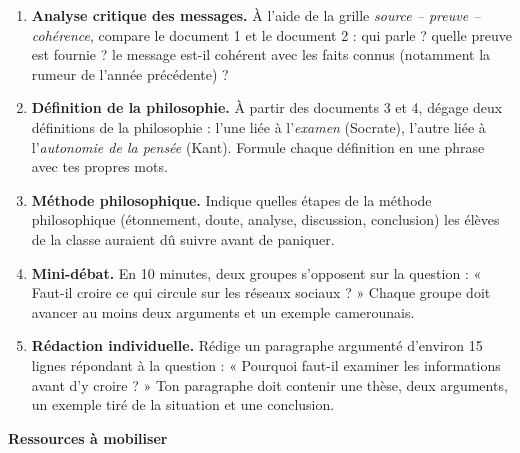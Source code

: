 \documentclass[11pt]{article}
\begin{document}
\begin{enumerate}
\item \textbf{Analyse critique des messages.} À l'aide de la grille \emph{source -- preuve -- cohérence}, compare le document 1 et le document 2 : qui parle ? quelle preuve est fournie ? le message est-il cohérent avec les faits connus (notamment la rumeur de l'année précédente) ?
\item \textbf{Définition de la philosophie.} À partir des documents 3 et 4, dégage deux définitions de la philosophie : l'une liée à l'\emph{examen} (Socrate), l'autre liée à l'\emph{autonomie de la pensée} (Kant). Formule chaque définition en une phrase avec tes propres mots.
\item \textbf{Méthode philosophique.} Indique quelles étapes de la méthode philosophique (étonnement, doute, analyse, discussion, conclusion) les élèves de la classe auraient dû suivre avant de paniquer.
\item \textbf{Mini-débat.} En 10 minutes, deux groupes s'opposent sur la question : « Faut-il croire ce qui circule sur les réseaux sociaux ? » Chaque groupe doit avancer au moins deux arguments et un exemple camerounais.
\item \textbf{Rédaction individuelle.} Rédige un paragraphe argumenté d'environ 15 lignes répondant à la question : « Pourquoi faut-il examiner les informations avant d'y croire ? » Ton paragraphe doit contenir une thèse, deux arguments, un exemple tiré de la situation et une conclusion.
\end{enumerate}

\textbf{Ressources à mobiliser}\par
\end{document}
